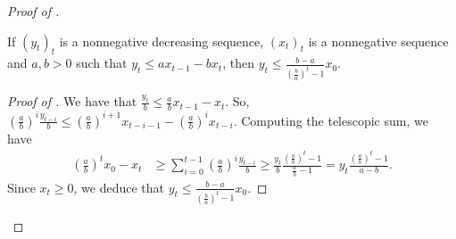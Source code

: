 \begin{proof}[Proof of ]
\begin{lemma}
    \label{lemma:bound_seq}
    If $(y_t)_t$ is a nonnegative decreasing sequence, $(x_t)_t$ is a nonnegative sequence and
    $a, b > 0$ such that $y_t \leq a x_{t-1} - b x_t$, then
    $y_t \leq \frac{b-a}{\left( \frac{b}{a} \right)^t - 1} x_0$.
\end{lemma}
\begin{proof}[Proof of ]
We have that $\frac{y_t}{b} \leq \frac{a}{b} x_{t-1} - x_t$. So,
$\left( \frac{a}{b} \right)^i \frac{y_{t-i}}{b} \leq
\left(\frac{a}{b} \right)^{i+1} x_{t-i-1} - \left( \frac{a}{b} \right)^i x_{t-i}$.
Computing the telescopic sum, we have
\begin{align}
    \left( \frac{a}{b} \right)^t x_0 - x_t &\geq
    \sum_{i=0}^{t-1} \left( \frac{a}{b} \right)^i \frac{y_{t-i}}{b}
    \geq \frac{y_t}{b} \frac{\left( \frac{a}{b} \right)^t - 1}{\frac{a}{b} - 1}
    = y_t \frac{\left( \frac{a}{b} \right)^t - 1}{a - b}.
\end{align}
Since $x_t \geq 0$, we deduce that
$y_t \leq \frac{b-a}{\left( \frac{b}{a} \right)^t - 1} x_0$.
\end{proof}


\end{proof}
